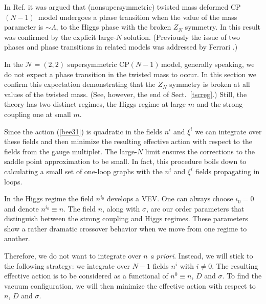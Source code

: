 \documentclass[epsfig,12pt]{article}
\newcommand{\cpn}{CP$(N-1)\,$}
\newcommand{\ntwot}{${\mathcal N}= \left(2,2\right) $ }
\begin{document}
In Ref. \cite{GSY05}
it was argued that (nonsupersymmetric) twisted mass deformed \mbox{\cpn} model
undergoes a phase transition when the value of the mass parameter is
$\sim \Lambda$, to the Higgs phase with the broken $Z_N$ symmetry.
 In \cite{GSYphtr} this result was confirmed by the explicit
 large-$N$ solution. (Previously
the issue of two phases and phase transitions in related models
was  addressed by Ferrari
\cite{Ferrari,Ferrari2}.)

In the \ntwot supersymmetric \cpn model, generally speaking,  we do not expect a phase transition
in the 
twisted mass to occur.  In this section we confirm this expectation demonstrating
that the $Z_N$ symmetry is  broken at all values of the twisted mass. 
(See, however, the end of Sect.~\ref{tscreg}.)
Still, the theory has two 
distinct regimes, the Higgs regime at large $m$ and the  strong-coupling one at small $m$.

Since the action (\ref{bee31}) is quadratic in the fields $n^{i}$ and $\xi^i$
we can integrate over these fields and then minimize the resulting
effective action with respect to the  fields from the gauge multiplet. The large-$N$ limit ensures the corrections to the saddle point approximation to be  small. In fact,
this procedure boils down to calculating a small set of one-loop graphs with the
$n^{i}$ and $\xi^i$  fields propagating in loops.

In the Higgs regime the field $n^{i_0}$ develops a VEV.
One can always choose $i_0=0$ and denote $n^{i_0}\equiv n$. 
The field $n$, along with $\sigma$, are
our order parameters that distinguish between the
strong coupling  and Higgs regimes. These parameters show a rather dramatic crossover behavior
when we move from one regime to another.

Therefore, we do not want
to integrate over $n$ {\em a priori}. Instead,
we will stick to the following strategy:  we integrate over $N-1$
fields $n^{i}$ with $i \ne 0$.
The resulting effective action is to be considered as
a functional of $n^0\equiv n$, $D$ and
$\sigma$. To find the vacuum configuration, we will then minimize the
effective action with
respect to $n$, $D$ and
$\sigma$.
\end{document}
